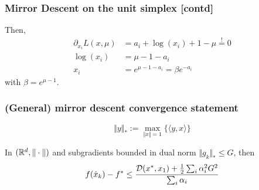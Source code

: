 \documentclass{beamer}
\begin{document}
\begin{frame}
  \frametitle{Mirror Descent on the unit simplex [contd]}
      Then,
      \begin{equation}
        \begin{aligned}
          \partial_{x_i} L(x,\mu) &= a_i + \log(x_i) +1 - \mu \overset{!}{=} 0 \\
          \log(x_i) &= \mu -1 - a_i  \\
          x_i &= e^{\mu - 1 - a_i} = \beta e^{-a_i}
        \end{aligned}
      \end{equation}
      with $\beta= e^{\mu-1}$.


\end{frame}

%
\begin{frame}
  \frametitle{(General) mirror descent convergence statement}
  \begin{equation}
    \Vert y \Vert_* := \max_{\Vert x \Vert=1} \{ \langle y, x \rangle\}
  \end{equation}
  \begin{theorem}
    In $(\mathbb{R}^d, \Vert \cdot \Vert)$ and subgradients bounded in dual norm $\Vert g_k \Vert_* \le G$, then
    \begin{equation}
      f(\hat{x}_k) - f^* \le \frac{\mathcal{D}(x^*, x_1) + \frac12 \sum_i \alpha_i^2 G^2}{\sum_i \alpha_i}
    \end{equation}
  \end{theorem}


\end{frame}
\end{document}
